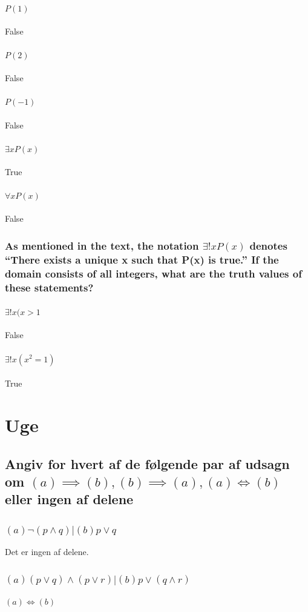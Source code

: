\documentclass[12pt, a4paper]{report}
\begin{document}
				\subsubsection{$P(1)$}
					False
				\subsubsection{$P(2)$}
					False
				\subsubsection{$P(-1)$}
					False
				\subsubsection{$\exists x P(x)$}
					True
				\subsubsection{$\forall x P(x)$}
					False
			\subsection{As mentioned in the text, the notation $\exists!xP(x)$ denotes “There exists a unique x such that P(x) is true.” If the domain consists of all integers, what are the truth values of these statements?}
				\subsubsection{$\exists!x(x>1$}
					False
				\subsubsection{$\exists!x(x^2=1)$}
					True
	\chapter{Uge}
		\section{Angiv for hvert af de følgende par af udsagn om $(a)\implies (b), (b)\implies (a), (a)\iff (b)$ eller ingen af delene}
			\subsection{$(a) \neg(p\land q) | (b) p\lor q$}
				Det er ingen af delene.
			\subsection{$(a) (p\lor q)\land (p \lor r) | (b) p\lor (q\land r)$}
				$(a)\iff(b)$ 
\end{document}
